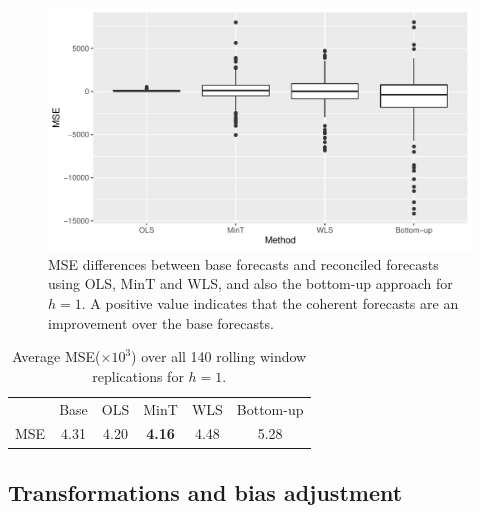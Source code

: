 \documentclass[12pt]{article}
\theoremstyle{definition}
\begin{document}
\begin{figure}[!hbt]
    \centering
    \small
    \includegraphics[width = \textwidth]{Figs/BoxPlot.pdf}
    \caption{MSE differences between base forecasts and reconciled forecasts using OLS, MinT and WLS, and also the bottom-up approach for $h = 1$. A positive value indicates that the coherent forecasts are an improvement over the base forecasts.}\label{fig:BaseVSRecon_Fc}
\end{figure}

\begin{table}[!hbt]
\caption {Average {MSE($\times 10^3$)} over all 140 rolling window replications for $h=1$.}\label{tab:AveraveDifferences}
  \centering \tabcolsep=0.4cm
  \begin{tabular}{lccccc}
  \toprule
          & Base & OLS & MinT & WLS & Bottom-up \\
   MSE    & 4.31 & 4.20 & \textbf{4.16} & 4.48 & 5.28 \\
  \bottomrule
  \end{tabular}
\end{table}

\subsection{Transformations and bias adjustment}
\end{document}
